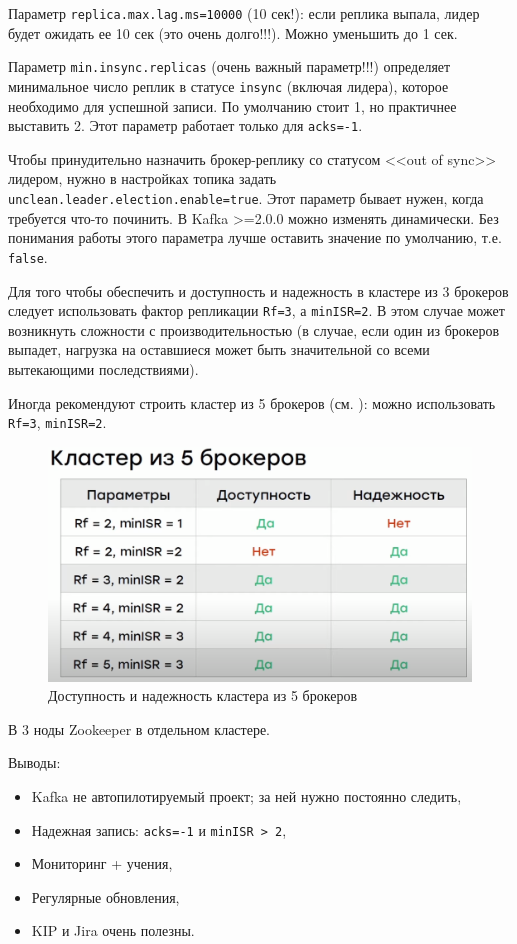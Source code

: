 \documentclass[%
	11pt,
	a4paper,
	utf8,
		]{article}
\begin{document}
Параметр \texttt{replica.max.lag.ms=10000} (10 сек!): если реплика выпала, лидер будет ожидать ее 10 сек (это очень долго!!!). Можно уменьшить до 1 сек.

Параметр \texttt{min.insync.replicas} (очень важный параметр!!!) определяет минимальное число реплик в статусе \texttt{insync} (включая лидера), которое необходимо для успешной записи. По умолчанию стоит 1, но практичнее выставить 2. Этот параметр работает только для \texttt{acks=-1}.

Чтобы принудительно назначить брокер-реплику со статусом <<out of sync>> лидером, нужно в настройках топика задать \texttt{unclean.leader.election.enable=true}. Этот параметр бывает нужен, когда требуется что-то починить. В Kafka >=2.0.0 можно изменять динамически. Без понимания работы этого параметра лучше оставить значение по умолчанию, т.е. \texttt{false}.

Для того чтобы обеспечить и доступность и надежность в кластере из 3 брокеров следует использовать фактор репликации \texttt{Rf=3}, а \texttt{minISR=2}. В этом случае может возникнуть сложности с производительностью (в случае, если один из брокеров выпадет, нагрузка на оставшиеся может быть значительной со всеми вытекающими последствиями).

Иногда рекомендуют строить кластер из 5 брокеров (см. ): можно использовать \texttt{Rf=3}, \texttt{minISR=2}.

\begin{figure}[h]
	\centering
	\includegraphics[scale=0.55]{figures/cluster5brokers.png}
	\caption{ Доступность и надежность кластера из 5 брокеров }\label{fig:cluster5brokers}
\end{figure}

В 3 ноды Zookeeper в отдельном кластере.

Выводы:
\begin{itemize}
	\item Kafka не автопилотируемый проект; за ней нужно постоянно следить,
	
	\item Надежная запись: \texttt{acks=-1} и \texttt{minISR > 2},
	
	\item Мониторинг + учения,
	
	\item Регулярные обновления,
	
	\item KIP и Jira очень полезны.
\end{itemize}
\end{document}
